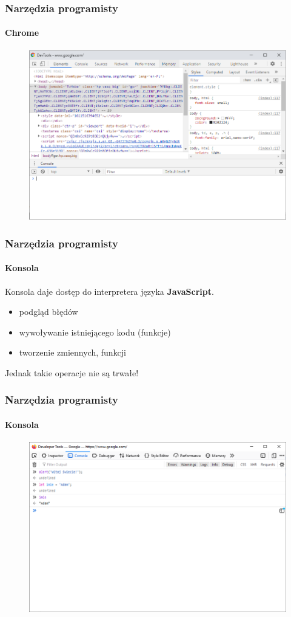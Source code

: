 \begin{frame}[fragile]
  \frametitle{Narzędzia programisty}
  \framesubtitle{Chrome}

  \begin{figure}
    \includegraphics[scale=0.45]{images/dev-tools-chrome}
  \end{figure}
\end{frame}


\begin{frame}[fragile]
  \frametitle{Narzędzia programisty}
  \framesubtitle{Konsola}

  Konsola daje dostęp do interpretera języka \textbf{JavaScript}.

  \begin{itemize}
      \item podgląd błędów
      \item wywoływanie istniejącego kodu (funkcje)
      \item tworzenie zmiennych, funkcji
  \end{itemize}

  Jednak takie operacje nie są trwałe!
\end{frame}


\begin{frame}[fragile]
  \frametitle{Narzędzia programisty}
  \framesubtitle{Konsola}

  \begin{figure}
    \includegraphics[scale=0.45]{images/dev-tools-console}
  \end{figure}
\end{frame}



